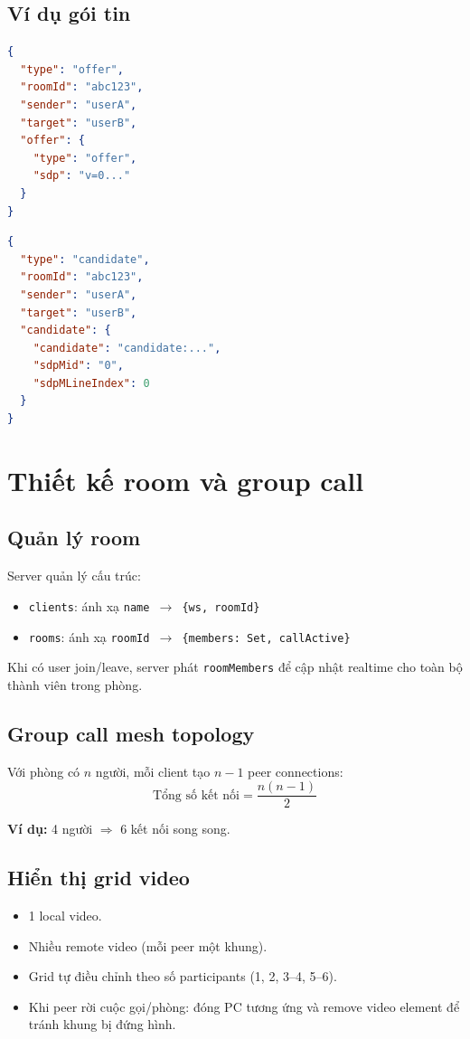 \documentclass[12pt,a4paper]{article}
\begin{document}
\subsection{Ví dụ gói tin}
\begin{lstlisting}[language=json,caption={Offer message}]
{
  "type": "offer",
  "roomId": "abc123",
  "sender": "userA",
  "target": "userB",
  "offer": {
    "type": "offer",
    "sdp": "v=0..."
  }
}
\end{lstlisting}

\begin{lstlisting}[language=json,caption={ICE candidate message}]
{
  "type": "candidate",
  "roomId": "abc123",
  "sender": "userA",
  "target": "userB",
  "candidate": {
    "candidate": "candidate:...",
    "sdpMid": "0",
    "sdpMLineIndex": 0
  }
}
\end{lstlisting}

\section{Thiết kế room và group call}

\subsection{Quản lý room}
Server quản lý cấu trúc:
\begin{itemize}[leftmargin=1.5em]
  \item \texttt{clients}: ánh xạ \texttt{name $\rightarrow$ \{ws, roomId\}}
  \item \texttt{rooms}: ánh xạ \texttt{roomId $\rightarrow$ \{members: Set, callActive\}}
\end{itemize}

Khi có user join/leave, server phát \texttt{roomMembers} để cập nhật realtime cho toàn bộ thành viên trong phòng.

\subsection{Group call mesh topology}
Với phòng có $n$ người, mỗi client tạo $n-1$ peer connections:
\[
\text{Tổng số kết nối} = \frac{n(n-1)}{2}
\]

\textbf{Ví dụ:} 4 người $\Rightarrow$ 6 kết nối song song.

\subsection{Hiển thị grid video}
\begin{itemize}[leftmargin=1.5em]
  \item 1 local video.
  \item Nhiều remote video (mỗi peer một khung).
  \item Grid tự điều chỉnh theo số participants (1, 2, 3--4, 5--6).
  \item Khi peer rời cuộc gọi/phòng: đóng PC tương ứng và remove video element để tránh khung bị đứng hình.
\end{itemize}
\end{document}
